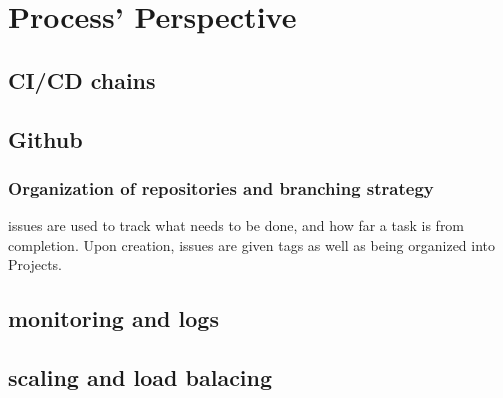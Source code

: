 \section{Process' Perspective}
\label{sec:process_perspective}



\subsection{CI/CD chains}


\subsection{Github}

\subsubsection{Organization of repositories and branching strategy}
issues are used to track what needs to be done, and how far a task is from completion. Upon creation, issues are given tags as well as being organized into Projects.


\subsection{monitoring and logs}

\subsection{scaling and load balacing}
